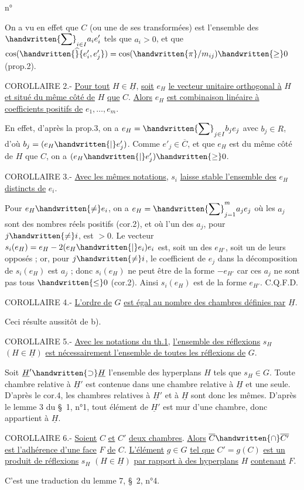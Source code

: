 \begin{flushright}n°\end{flushright}
On a vu en effet que $C$ (ou une de ses transformées) est l'ensemble des $\displaystyle\handwritten{\sum}_{i\in I}a_i e'_i$ tels que $a_i>0$, et que $\cos(\handwritten{\widehat}{e'_i,e'_j})=\cos(\handwritten{\pi}/m_{ij})\handwritten{\geq}0$ (prop.2).

COROLLAIRE 2.- \uline{Pour tout} $H\in\underline{H}$, \uline{soit} $e_H$ \uline{le vecteur unitaire orthogonal à} $H$ \uline{et situé du même côté de} $H$ \uline{que} $C$. \uline{Alors} $e_H$ \uline{est combinaison linéaire à coefficients positifs de} $e_1,\ldots,e_m$.

En effet, d'après la prop.3, on a $\displaystyle e_H=\handwritten{\sum}_{j\in I}b_j e_j$ avec $b_j\in R$, d'où $b_j=(e_H\handwritten{|}e'_j)$. Comme $e'_j\in\overline{C}$, et que $e_H$ est du même côté de $H$ que $C$, on a $(e_H\handwritten{|}e'_j)\handwritten{\geq}0$.

COROLLAIRE 3.- \uline{Avec les mêmes notations}, $s_i$ \uline{laisse stable l'ensemble des} $e_H$ \uline{distincts de} $e_i$.

Pour $e_H\handwritten{\ne}e_i$, on a $\displaystyle e_H=\handwritten{\sum}_{j=1}^m a_j e_j$ où les $a_j$ sont des nombres réels positifs (cor.2), et où l'un des $a_j$, pour $j\handwritten{\ne}i$, est $>0$. Le vecteur $s_i(e_H)=e_H-2(e_H\handwritten{|}e_i)e_i$ est, soit un des $e_{H'}$, soit un de leurs opposés ; or, pour $j\handwritten{\ne}i$, le coefficient de $e_j$ dans la décomposition de $s_i(e_H)$ est $a_j$ ; donc $s_i(e_H)$ ne peut être de la forme $-e_{H'}$ car ces $a_j$ ne sont pas tous $\handwritten{\leq}0$ (cor.2). Ainsi $s_i(e_H)$ est de la forme $e_{H'}$. C.Q.F.D.

COROLLAIRE 4.- \uline{L'ordre de} $G$ \uline{est égal au nombre des chambres définies par} $\underline{H}$.

Ceci résulte aussitôt de b).

COROLLAIRE 5.- \uline{Avec les notations du th.1}, \uline{l'ensemble des réflexions} $s_H$ $(H\in\underline{H})$ \uline{est nécessairement l'ensemble de toutes les réflexions de} $G$.

Soit $\underline{H}'\handwritten{\supset}\underline{H}$ l'ensemble des hyperplans $H$ tels que $s_H\in G$. Toute chambre relative à $\underline{H}'$ est contenue dans une chambre relative à $\underline{H}$ et une seule. D'après le cor.4, les chambres relatives à $\underline{H}'$ et à $\underline{H}$ sont donc les mêmes. D'après le lemme 3 du \S\ 1, n°1, tout élément de $\underline{H}'$ est mur d'une chambre, donc appartient à $\underline{H}$.

COROLLAIRE 6.- \uline{Soient} $C$ \uline{et} $C'$ \uline{deux chambres}. \uline{Alors} $\overline{C}\handwritten{\cap}\overline{C'}$ \uline{est l'adhérence d'une face} $F$ \uline{de} $C$. \uline{L'élément} $g\in G$ \uline{tel que} $C'=g(C)$ \uline{est un produit de réflexions} $s_H$ $(H\in\underline{H})$ \uline{par rapport à des hyperplans} $H$ \uline{contenant} $F$.

C'est une traduction du lemme 7, \S\ 2, n°4.
